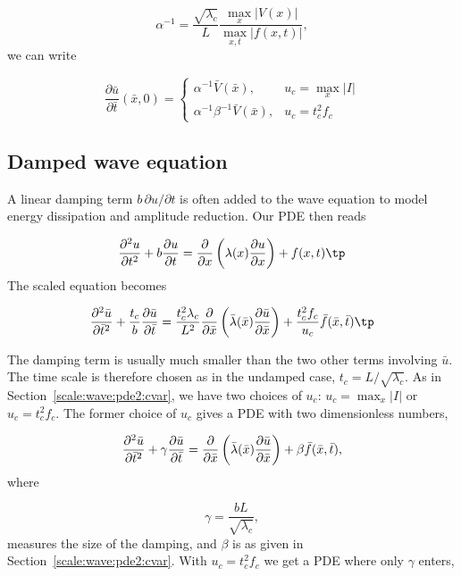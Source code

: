 \documentclass[graybox,envcountchap,sectrefs,final]{svmonodo}
\begin{document}
\[ \alpha^{-1} = \frac{\sqrt{\lambda_c}}{L}\frac{\max_{x}|V(x)|}{\max_{x,t}|f(x,t)|},
\]
we can write

\[
\frac{\partial\bar u}{\partial\bar t}(\bar x, 0) =
\left\lbrace \begin{array}{ll}
\alpha^{-1}\bar V(\bar x),& u_c=\max_x|I|\\ 
\alpha^{-1}\beta^{-1}\bar V(\bar x), & u_c=t_c^2f_c
\end{array}\right.
\]

\subsection{Damped wave equation}
\label{scale:wave:pde2:damped}

A linear damping term $b\,\partial u/\partial t$ is often added to
the wave equation to model energy dissipation and amplitude reduction.
Our PDE then reads

\begin{equation}
\frac{\partial^2 u}{\partial t^2}
+ b\frac{\partial u}{\partial t} =
\frac{\partial}{\partial x}\left(
\lambda(x) {\partial u\over\partial x}\right) + f(x,t)\tp
\end{equation}
The scaled equation becomes

\[
\frac{\partial^2 \bar u}{\partial \bar t^2}
+ \frac{t_c} b\frac{\partial \bar u}{\partial \bar t} =
\frac{t_c^2\lambda_c}{L^2}\frac{\partial}{\partial \bar x}\left(
\bar \lambda(\bar x) {\partial \bar u\over\partial \bar x}\right) +
\frac{t_c^2f_c}{u_c}\bar f(\bar x,\bar t)\tp
\]

The damping term is usually much smaller than the two other terms involving
$\bar u$. The time scale is therefore chosen as in the undamped case,
$t_c=L/\sqrt{\lambda_c}$. As in Section~\ref{scale:wave:pde2:cvar},
we have two choices of $u_c$: $u_c=\max_x|I|$ or $u_c=t_c^2f_c$.
The former choice of $u_c$ gives a PDE with two dimensionless numbers,

\begin{equation}
\frac{\partial^2 \bar u}{\partial \bar t^2}
+ \gamma\frac{\partial \bar u}{\partial \bar t} =
\frac{\partial}{\partial \bar x}\left(
\bar \lambda(\bar x) {\partial\bar u\over\partial\bar x}\right) +
\beta\bar f(\bar x,\bar t),
\end{equation}
where

\[ \gamma = \frac{bL}{\sqrt{\lambda_c}}, \]
measures the size of the damping, and $\beta$ is as given
in Section~\ref{scale:wave:pde2:cvar}.
With $u_c=t_c^2f_c$ we get a PDE where only $\gamma$ enters,
\end{document}
